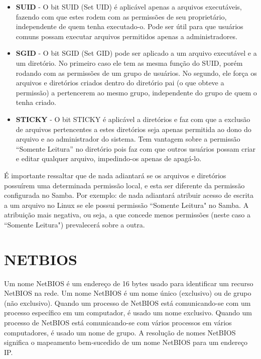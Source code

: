   \begin{itemize}
    \item \textbf{SUID} - O bit SUID (Set UID) é aplicável apenas a arquivos executáveis, fazendo com que estes rodem com as permissões de seu proprietário, independente de quem tenha executado-o. Pode ser útil para que usuários comuns possam executar arquivos permitidos apenas a administradores.

    \item \textbf{SGID} - O bit SGID (Set GID) pode ser aplicado a um arquivo executável e a um diretório. No primeiro caso ele tem as mesma função do SUID, porém rodando com as permissões de um grupo de usuários. No segundo, ele força os arquivos e diretórios criados dentro do diretório pai (o que obteve a permissão) a pertencerem ao mesmo grupo, independente do grupo de quem o tenha criado.

    \item \textbf{STICKY} - O bit STICKY é aplicável a diretórios e faz com que a exclusão de arquivos pertencentes a estes diretórios seja apenas permitida ao dono do arquivo e ao administrador do sistema. Tem vantagem sobre a permissão “Somente Leitura” no diretório pois faz com que outros usuários possam criar e editar qualquer arquivo, impedindo-os apenas de apagá-lo.
  \end{itemize}

É importante ressaltar que de nada adiantará se os arquivos e diretórios possuírem uma determinada permissão local, e esta ser diferente da permissão configurada no Samba. Por exemplo: de nada adiantará atribuir acesso de escrita a um arquivo no Linux se ele possui permissão ``Somente Leitura" no Samba. A atribuição mais negativa, ou seja, a que concede menos permissões (neste caso a ``Somente Leitura") prevalecerá sobre a outra.

\section{NETBIOS}

Um nome NetBIOS é um endereço de 16 bytes usado para identificar um recurso NetBIOS na rede. Um nome NetBIOS é um nome único (exclusivo) ou de grupo (não exclusivo). Quando um processo de NetBIOS está comunicando-se com um processo específico em um computador, é usado um nome exclusivo. Quando um processo de NetBIOS está comunicando-se com vários processos em vários computadores, é usado um nome de grupo. A resolução de nomes NetBIOS significa o mapeamento bem-sucedido de um nome NetBIOS para um endereço IP.\cite{NETBIOS_}

